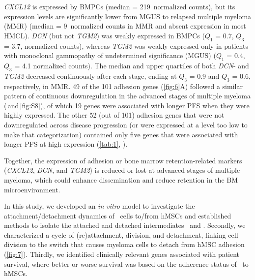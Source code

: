 \textit{CXCL12} is expressed by BMPCs (median = 219~normalized counts), but its
expression levels are significantly lower from MGUS to relapsed multiple myeloma
(MMR) (median = 9~normalized counts in MMR and absent expression in most HMCL).
\textit{DCN} (but not \textit{TGM2}) was weakly expressed in BMPCs ($Q_1$ = 0.7,
$Q_3$ = 3.7, normalized counts), whereas \textit{TGM2} was weakly expressed only
in patients with monoclonal gammopathy of undetermined significance (MGUS)
($Q_1$ = 0.4, $Q_3$ = 4.1 normalized counts). The median and upper quartiles of
both \textit{DCN}- and \textit{TGM2} decreased continuously after each stage,
ending at $Q_3$ = 0.9 and $Q_3$ = 0.6, respectively, in MMR. 49 of the 101 adhesion genes
(\autoref{fig:6}A) followed a similar pattern of continuous downregulation in
the advanced stages of multiple myeloma (\,and\,\ref{fig:S8}), of which 19 genes were associated with
longer PFS when they were highly expressed. The other 52 (out of 101) adhesion
genes that were not downregulated across disease progression (or were expressed
at a level too low to make that categorization) contained only five genes that
were associated with longer PFS at high expression (\autoref{tab:1},
).

Together, the expression of adhesion or bone marrow retention-related markers
(\textit{CXCL12}, \textit{DCN}, and \textit{TGM2}) is reduced or lost at
advanced stages of multiple myeloma, which could enhance dissemination and
reduce retention in the BM microenvironment.


\newpage


\label{C1:discussion} %
In this study, we developed an \textit{in vitro} model to investigate the
attachment/detachment dynamics of \INA\ cells to/from hMSCs and established
methods to isolate the attached and detached intermediates \nMAina\ and \MAina.
Secondly, we characterized a cycle of (re)attachment, division, and detachment,
linking cell division to the switch that causes myeloma cells to detach from
hMSC adhesion (\autoref{fig:7}). Thirdly, we identified clinically relevant
genes associated with patient survival, where better or worse survival was based
on the adherence status of \INA\ to hMSCs.

